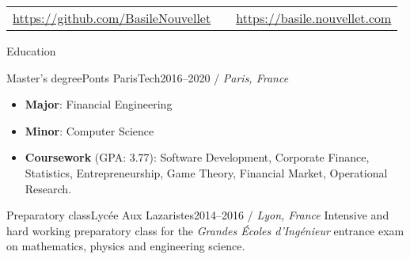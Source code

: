 \documentclass[]{mcdowellcv}
\begin{document}
    \makeheader

    \begin{tabu}
        to 1\textwidth { X[2,l,p] X[c,p] X[2,r,p] }
        {\small \url{https://github.com/BasileNouvellet}} & \textbf{} & {\small \url{https://basile.nouvellet.com}} \\
    \end{tabu}

    \begin{cvsection}{Education}

        \begin{cvsubsection}{Master's degree}{Ponts ParisTech}{2016--2020 / \textit{Paris, France}}
            \begin{itemize}
                \item \textbf{Major}: Financial Engineering
                \item \textbf{Minor}: Computer Science
                \item \textbf{Coursework} (GPA: 3.77): Software Development, Corporate Finance, Statistics, Entrepreneurship, Game Theory, Financial Market, Operational Research.
            \end{itemize}
        \end{cvsubsection}

        \begin{cvsubsection}{Preparatory class}{Lyc\'ee Aux Lazaristes}{2014--2016 / \textit{Lyon, France}}
            Intensive and hard working preparatory class for the \textit{Grandes \'Ecoles d'Ing\'enieur} entrance exam on mathematics, physics and engineering science.
        \end{cvsubsection}

    \end{cvsection}
\end{document}
